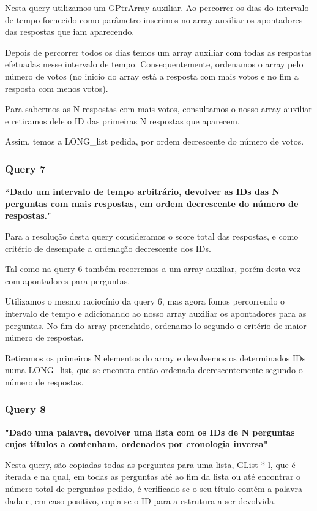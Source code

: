 \documentclass[a4paper]{article}
\begin{document}
Nesta query utilizamos um GPtrArray auxiliar. Ao percorrer os dias do intervalo
de tempo fornecido como parâmetro inserimos no array auxiliar os apontadores das
respostas que iam aparecendo.

Depois de percorrer todos os dias temos um array auxiliar com todas as respostas
efetuadas nesse intervalo de tempo. Consequentemente, ordenamos o array pelo número
de votos (no inicio do array está a resposta com mais votos e no fim a resposta
com menos votos).

Para sabermos as N respostas com mais votos, consultamos o nosso array auxiliar
e retiramos dele o ID das primeiras N respostas que aparecem.

Assim, temos a LONG\_list pedida, por ordem decrescente do número de votos.

\subsubsection*{Query 7}
\label{sec:query7}

\textbf{“Dado um intervalo de tempo arbitrário, devolver as IDs das N perguntas
com mais respostas, em ordem decrescente do número de respostas."}

Para a resolução desta query consideramos o score total das respostas, e como
critério de desempate a ordenação decrescente dos IDs.

Tal como na query 6 também recorremos a um array auxiliar, porém
desta vez com apontadores para perguntas.

Utilizamos o mesmo raciocínio da query 6, mas agora fomos percorrendo o intervalo
de tempo e adicionando ao nosso array auxiliar os apontadores para as perguntas.
No fim do array preenchido, ordenamo-lo segundo o critério de maior número de respostas.

Retiramos os primeiros N elementos do array e devolvemos os determinados IDs
numa LONG\_list, que se encontra então ordenada decrescentemente segundo o número de respostas.

\subsubsection*{Query 8}
\label{sec:query8}

\textbf{"Dado uma palavra, devolver uma lista com os IDs de
N perguntas cujos títulos a contenham, ordenados por cronologia inversa"}

Nesta query, são copiadas todas as perguntas para uma lista, GList * l, que é iterada
e na qual, em todas as perguntas até ao fim da lista ou até encontrar o número total de
perguntas pedido, é verificado se o seu título contém a palavra dada e, em caso positivo,
copia-se o ID para a estrutura a ser devolvida.
\end{document}
